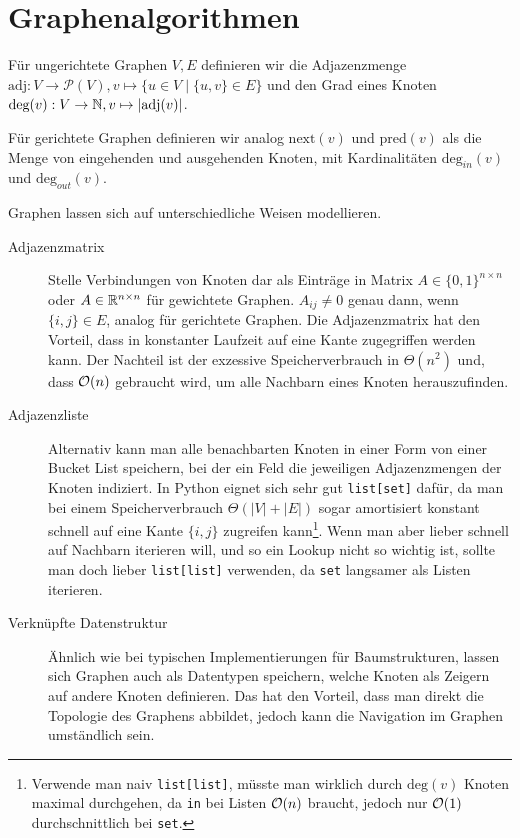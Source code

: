 \newcommand{\adj}{\text{adj}}
\renewcommand{\deg}{\text{deg}}
\newcommand{\nxt}{\text{next}}
\newcommand{\prd}{\text{pred}}

\section{Graphenalgorithmen}\label{sec:6}
Für ungerichtete Graphen \(V, E\) definieren wir die Adjazenzmenge \(\adj : V \rightarrow \mathcal P(V), v \mapsto \{u \in V \mid \{u, v\} \in E\}\) und den Grad eines Knoten \(\deg(v) : V \rightarrow \N, v \mapsto |\adj(v)|\).

Für gerichtete Graphen definieren wir analog \(\nxt(v)\) und \(\prd(v)\) als die Menge von eingehenden und ausgehenden Knoten, mit Kardinalitäten \(\deg_{in}(v)\) und \(\deg_{out}(v)\).

Graphen lassen sich auf unterschiedliche Weisen modellieren.
\begin{description}
    \item[Adjazenzmatrix] Stelle Verbindungen von Knoten dar als Einträge in Matrix \(A \in \{0, 1\}^{n \times n}\) oder \(A \in \mathbb R^{n \times n}\) für gewichtete Graphen.
        \(A_{ij} \ne 0\) genau dann, wenn \(\{i, j\} \in E\), analog für gerichtete Graphen.
        Die Adjazenzmatrix hat den Vorteil, dass in konstanter Laufzeit auf eine Kante zugegriffen werden kann.
        Der Nachteil ist der exzessive Speicherverbrauch in \(\Theta(n^2)\) und, dass \(\mathcal O(n)\) gebraucht wird, um alle Nachbarn eines Knoten herauszufinden.

    \item[Adjazenzliste] Alternativ kann man alle benachbarten Knoten in einer Form von einer Bucket List speichern, bei der ein Feld die jeweiligen Adjazenzmengen der Knoten indiziert.
        In Python eignet sich sehr gut \lstinline|list[set]| dafür, da man bei einem Speicherverbrauch \(\Theta(|V| + |E|)\) sogar amortisiert konstant schnell auf eine Kante \(\{i, j\}\) zugreifen kann\footnote{Verwende man naiv \lstinline|list[list]|, müsste man wirklich durch \(\deg(v)\) Knoten maximal durchgehen, da \lstinline|in| bei Listen \(\mathcal O(n)\) braucht, jedoch nur \(\mathcal O(1)\) durchschnittlich bei \lstinline|set|.}.
        Wenn man aber lieber schnell auf Nachbarn iterieren will, und so ein Lookup nicht so wichtig ist, sollte man doch lieber \lstinline|list[list]| verwenden, da \lstinline|set| langsamer als Listen iterieren.

    \item[Verknüpfte Datenstruktur] Ähnlich wie bei typischen Implementierungen für Baumstrukturen, lassen sich Graphen auch als Datentypen speichern, welche Knoten als Zeigern auf andere Knoten definieren.
        Das hat den Vorteil, dass man direkt die Topologie des Graphens abbildet, jedoch kann die Navigation im Graphen umständlich sein.
\end{description}
